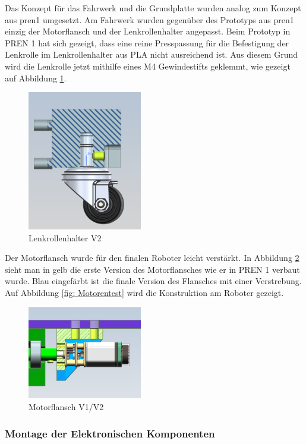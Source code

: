 Das Konzept für das Fahrwerk und die Grundplatte wurden analog zum Konzept aus \acrshort{pren1} umgesetzt. Am Fahrwerk wurden gegenüber des Prototyps aus \acrshort{pren1} einzig der Motorflansch und der Lenkrollenhalter angepasst. 
 Beim Prototyp in PREN 1 hat sich gezeigt, dass eine reine Presspassung für die Befestigung der Lenkrolle im Lenkrollenhalter aus PLA nicht ausreichend ist. Aus diesem Grund wird die Lenkrolle jetzt mithilfe eines M4 Gewindestifts geklemmt, wie gezeigt auf Abbildung \ref{fig: Lenkrollenhalter V2}.

\begin{figure}[H]
\centering
\includegraphics[width=5cm]{assets/MT/Lenkrollenhalter V2.png}
\caption{Lenkrollenhalter V2}
\label{fig: Lenkrollenhalter V2}
\end{figure}

Der Motorflansch wurde für den finalen Roboter leicht verstärkt. In Abbildung \ref{fig: Motorflansch V1/V2} sieht man in gelb die erste Version des Motorflansches wie er in PREN 1 verbaut wurde. Blau eingefärbt ist die finale Version des Flansches mit einer Verstrebung. Auf Abbildung \ref{fig: Motorentest} wird die Konstruktion am Roboter gezeigt.

\begin{figure}[H]
\centering
\includegraphics[width=5cm]{assets/MT/Motorflansch Vergleich.png}
\caption{Motorflansch V1/V2}
\label{fig: Motorflansch V1/V2}
\end{figure}

\subsubsection{Montage der Elektronischen Komponenten}
\label{Montage der Elektronischen Komponenten}

